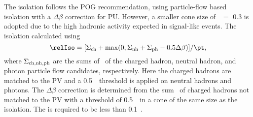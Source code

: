 The isolation follows the POG recommendation, using particle-flow based        
isolation with a $\Delta\beta$ correction for PU. However, a smaller cone      
size of \DR\ $=$ 0.3 is adopted due to the high hadronic activity expected in  
signal-like events. The isolation calculated using                             
$$
\relIso = [ \Sigma_{\rm ch} + {\rm max}(0, \Sigma_{\rm nh} + \Sigma_{\rm ph} - 0.5 \Delta\beta) ]/\pt,
$$
where $\Sigma_{\rm ch, nh, ph}$ are the sums of \pt\ of the charged hadron,
neutral hadron, and photon particle flow candidates, respectively. Here the
charged hadrons are matched to the PV and a 0.5~\GeV\ threshold is applied
on neutral hadrons and photons. The $\Delta\beta$ correction is determined
from the sum \pt\ of charged hadrons not matched to the PV with a threshold of
0.5~\GeV\ in a cone of the same size as the isolation. The \relIso is required
to be less than 0.1~\cite{muonpfisotwiki}.
